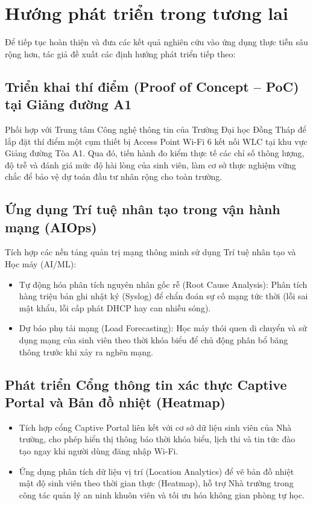 \section{Hướng phát triển trong tương lai}

Để tiếp tục hoàn thiện và đưa các kết quả nghiên cứu vào ứng dụng thực tiễn sâu rộng hơn, tác giả đề xuất các định hướng phát triển tiếp theo:

\subsection{Triển khai thí điểm (Proof of Concept -- PoC) tại Giảng đường A1}
Phối hợp với Trung tâm Công nghệ thông tin của Trường Đại học Đồng Tháp để lắp đặt thí điểm một cụm thiết bị Access Point Wi-Fi 6 kết nối WLC tại khu vực Giảng đường Tòa A1. Qua đó, tiến hành đo kiểm thực tế các chỉ số thông lượng, độ trễ và đánh giá mức độ hài lòng của sinh viên, làm cơ sở thực nghiệm vững chắc để bảo vệ dự toán đầu tư nhân rộng cho toàn trường.

\subsection{Ứng dụng Trí tuệ nhân tạo trong vận hành mạng (AIOps)}
Tích hợp các nền tảng quản trị mạng thông minh sử dụng Trí tuệ nhân tạo và Học máy (AI/ML):
\begin{itemize}
    \item Tự động hóa phân tích nguyên nhân gốc rễ (Root Cause Analysis): Phân tích hàng triệu bản ghi nhật ký (Syslog) để chẩn đoán sự cố mạng tức thời (lỗi sai mật khẩu, lỗi cấp phát DHCP hay can nhiễu sóng).
    \item Dự báo phụ tải mạng (Load Forecasting): Học máy thói quen di chuyển và sử dụng mạng của sinh viên theo thời khóa biểu để chủ động phân bổ băng thông trước khi xảy ra nghẽn mạng.
\end{itemize}

\subsection{Phát triển Cổng thông tin xác thực Captive Portal và Bản đồ nhiệt (Heatmap)}
\begin{itemize}
    \item Tích hợp cổng Captive Portal liên kết với cơ sở dữ liệu sinh viên của Nhà trường, cho phép hiển thị thông báo thời khóa biểu, lịch thi và tin tức đào tạo ngay khi người dùng đăng nhập Wi-Fi.
    \item Ứng dụng phân tích dữ liệu vị trí (Location Analytics) để vẽ bản đồ nhiệt mật độ sinh viên theo thời gian thực (Heatmap), hỗ trợ Nhà trường trong công tác quản lý an ninh khuôn viên và tối ưu hóa không gian phòng tự học.
\end{itemize}

